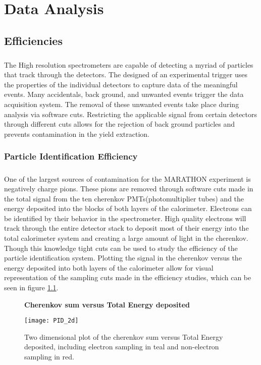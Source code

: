 \chapter{Data Analysis}

\section{Efficiencies}
\paragraph{}The High resolution spectrometers are capable of detecting a myriad of particles that track through the detectors. The designed of an experimental trigger uses the properties of the individual detectors to capture data of the meaningful events. Many accidentals, back ground, and unwanted events trigger the data acquisition system. The removal of these unwanted events take place during analysis via software cuts. Restricting the applicable signal from certain detectors through different cuts allows for the rejection of back ground particles and prevents contamination in the yield extraction. 

\subsection{Particle Identification Efficiency}
\paragraph{} One of the largest sources of contamination for the MARATHON experiment is negatively charge pions. These pions are removed through software cuts made in the total signal from the ten cherenkov PMTs(photomultiplier tubes) and the energy deposited into the blocks of both layers of the calorimeter. Electrons can be identified by their behavior in the spectrometer. High quality electrons will track through the entire detector stack to deposit most of their energy into the total calorimeter system and creating a large amount of light in the cherenkov. Though this knowledge tight cuts can be used to study the efficiency of the particle identification system. Plotting the signal in the cherenkov versus the energy deposited into both layers of the calorimeter allow for visual representation of the sampling cuts made in the efficiency studies, which can be seen in figure \ref{elesample}. 

\begin{figure}[h]
	\centering

	\textbf{Cherenkov sum versus Total Energy deposited }\par\medskip
	\texttt{[image: PID\_2d]}
	\caption{Two dimensional plot of the cherenkov sum versus Total Energy deposited, including electron sampling in teal and non-electron sampling in red. }
	\label{elesample}
\end{figure}

